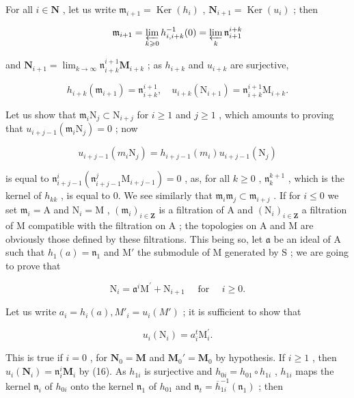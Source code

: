 For all \(i \in \mathbf{N}\) , let us write \(\mathfrak{m}_{i+1} = \operatorname{Ker}(h_i)\) , \(\mathbf{N}_{i+1} = \operatorname{Ker}(u_i)\) ; then

\[
\mathfrak {m} _ {i + 1} = \varprojlim_ {k \geqslant 0} h _ {i, i + k} ^ {- 1} (0) = \varprojlim_ {k} \mathfrak {n} _ {i + 1} ^ {i + k}
\]

and \(\mathbf{N}_{i + 1} = \lim_{k\to \infty}\mathfrak{n}_{i + k}^{i + 1}\mathbf{M}_{i + k}\) ; as \(h_{i + k}\) and \(u_{i + k}\) are surjective,

\[
h _ {i + k} \left(\mathfrak {m} _ {i + 1}\right) = \mathfrak {n} _ {i + k} ^ {i + 1}, \quad u _ {i + k} \left(\mathrm{N} _ {i + 1}\right) = \mathfrak {n} _ {i + k} ^ {i + 1} \mathrm{M} _ {i + k}.\tag{16}
\]

Let us show that \(\mathfrak{m}_i\mathrm{N}_j\subset \mathrm{N}_{i + j}\) for \(i\geqslant 1\) and \(j\geqslant 1\) , which amounts to proving that \(u_{i + j - 1}(\mathfrak{m}_i\mathrm{N}_j) = 0\) ; now

\[
u _ {i + j - 1} (m _ {i} \mathrm{N} _ {j}) = h _ {i + j - 1} (m _ {i}) u _ {i + j - 1} (\mathrm{N} _ {j})
\]

is equal to \(\mathfrak{n}_{i+j-1}^{i}(\mathfrak{n}_{i+j-1}^{j}\mathrm{M}_{i+j-1}) = 0\) , as, for all \(k \geqslant 0\) , \(\mathfrak{n}_k^{k+1}\) , which is the kernel of \(h_{kk}\) , is equal to 0. We see similarly that \(\mathfrak{m}_i\mathfrak{m}_j \subset \mathfrak{m}_{i+j}\) . If for \(i \leqslant 0\) we set \(\mathfrak{m}_i = \mathrm{A}\) and \(\mathrm{N}_i = \mathrm{M}\) , \((\mathfrak{m}_i)_{i \in \mathbf{Z}}\) is a filtration of \(\mathrm{A}\) and \((\mathrm{N}_i)_{i \in \mathbf{Z}}\) a filtration of \(\mathrm{M}\) compatible with the filtration on \(\mathrm{A}\) ; the topologies on \(\mathrm{A}\) and \(\mathrm{M}\) are obviously those defined by these filtrations. This being so, let \(\mathfrak{a}\) be an ideal of \(\mathrm{A}\) such that \(h_1(a) = \mathfrak{n}_1\) and \(\mathrm{M}'\) the submodule of \(\mathrm{M}\) generated by \(\mathrm{S}\) ; we are going to prove that

\[
\mathrm{N} _ {i} = \mathfrak {a} ^ {i} \mathrm{M} ^ {\prime} + \mathrm{N} _ {i + 1} \quad \text { for } \quad i \geqslant 0.\tag{17}
\]

Let us write \(a_i = h_i(a), M'_i = u_i(M')\) ; it is sufficient to show that

\[
u _ {i} \left(\mathrm{N} _ {i}\right) = a _ {i} ^ {t} \mathrm{M} _ {i} ^ {\prime}.
\]

This is true if \(i = 0\) , for \(\mathbf{N}_0 = \mathbf{M}\) and \(\mathbf{M}_0' = \mathbf{M}_0\) by hypothesis. If \(i \geqslant 1\) , then \(u_i(\mathbf{N}_i) = \mathfrak{n}_i^i\mathbf{M}_i\) by (16). As \(h_{1i}\) is surjective and \(h_{0i} = h_{01} \circ h_{1i}\) , \(h_{1i}\) maps the kernel \(\mathfrak{n}_i\) of \(h_{0i}\) onto the kernel \(\mathfrak{n}_1\) of \(h_{01}\) and \(\mathfrak{n}_t = \overline{h}_{1i}^{-1}(\mathfrak{n}_1)\) ; then

